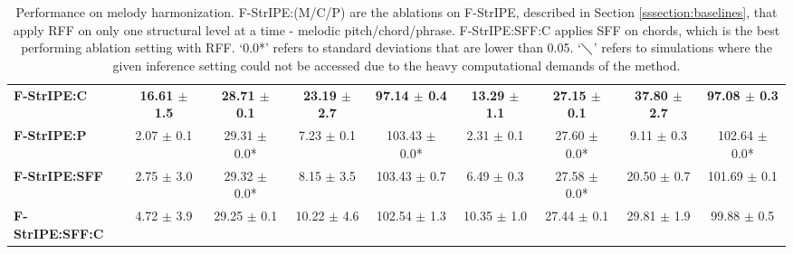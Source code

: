 \begin{table*}[t]
{\begin{tabular}{lcccccccc}
\multicolumn{1}{l|}{\textbf{F-StrIPE:C}} & \textbf{16.61 $\pm$ 1.5\phantom{*}} & \textbf{28.71 $\pm$ 0.1\phantom{*}} & \textbf{23.19 $\pm$ 2.7\phantom{*}} & \multicolumn{1}{c|}{\textbf{\phantom{0}97.14 $\pm$ 0.4\phantom{*}}} & \textbf{13.29 $\pm$ 1.1} & \textbf{27.15 $\pm$ 0.1\phantom{*}} & \textbf{37.80 $\pm$ 2.7} & \multicolumn{1}{c}{\textbf{\phantom{0}97.08 $\pm$ 0.3\phantom{*}}} \\
\multicolumn{1}{l|}{\textbf{F-StrIPE:P}} & \phantom{0}2.07 $\pm$ 0.1\phantom{*} & 29.31 $\pm$ 0.0* & \phantom{0}7.23 $\pm$ 0.1\phantom{*} & \multicolumn{1}{c|}{103.43 $\pm$ 0.0*} & \phantom{0}2.31 $\pm$ 0.1 & 27.60 $\pm$ 0.0* & \phantom{0}9.11 $\pm$ 0.3 & \multicolumn{1}{c}{102.64 $\pm$ 0.0*} \\ \hline
\multicolumn{1}{l|}{\textbf{F-StrIPE:SFF}} & \phantom{0}2.75 $\pm$ 3.0\phantom{*} & 29.32 $\pm$ 0.0* & \phantom{0}8.15 $\pm$ 3.5\phantom{*} & \multicolumn{1}{c|}{103.43 $\pm$ 0.7\phantom{*}} & \phantom{0}6.49 $\pm$ 0.3 & 27.58 $\pm$ 0.0* & 20.50 $\pm$ 0.7 & \multicolumn{1}{c}{101.69 $\pm$ 0.1\phantom{*}} \\
\multicolumn{1}{l|}{\textbf{F-StrIPE:SFF:C}} & \phantom{0}4.72 $\pm$ 3.9\phantom{*} & 29.25 $\pm$ 0.1\phantom{*} & 10.22 $\pm$ 4.6\phantom{*} & \multicolumn{1}{c|}{102.54 $\pm$ 1.3\phantom{*}} & 10.35 $\pm$ 1.0 & 27.44 $\pm$ 0.1\phantom{*} & 29.81 $\pm$ 1.9 & \multicolumn{1}{c}{\phantom{0}99.88 $\pm$ 0.5\phantom{*}} \\ \hline
\end{tabular}
}
\caption{Performance on melody harmonization. F-StrIPE:(M/C/P) are the ablations on F-StrIPE, described in Section \ref{sssection:baselines}, that apply RFF on only one structural level at a time - melodic pitch/chord/phrase. F-StrIPE:SFF:C applies SFF on chords, which is the best performing ablation setting with RFF. `0.0*' refers to standard deviations that are lower than 0.05. `$\diagdown$' refers to simulations where the given inference setting could not be accessed due to the heavy computational demands of the method.}
\label{tab:results_unrounded}
\end{table*}